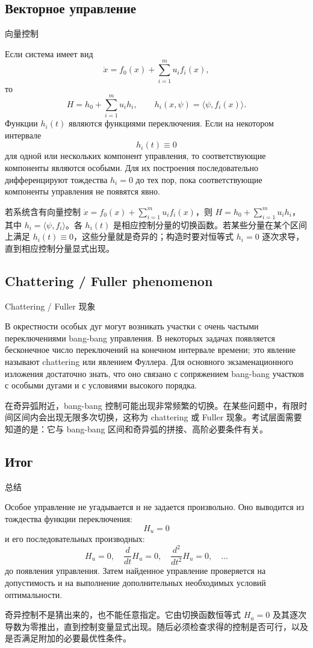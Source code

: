 \documentclass[12pt,a4paper]{article}
\newcommand{\zh}[1]{\par\noindent #1\par}
\begin{document}
\subsection*{Векторное управление}
\zh{向量控制}
Если система имеет вид
\[
\dot x=f_0(x)+\sum_{i=1}^m u_i f_i(x),
\]
то
\[
H=h_0+\sum_{i=1}^m u_i h_i,
\qquad
h_i(x,\psi)=\langle \psi,f_i(x)\rangle.
\]
Функции $h_i(t)$ являются функциями переключения. Если на некотором интервале
\[
h_i(t)\equiv0
\]
для одной или нескольких компонент управления, то соответствующие компоненты являются особыми. Для их построения последовательно дифференцируют тождества $h_i=0$ до тех пор, пока соответствующие компоненты управления не появятся явно.
\zh{若系统含有向量控制 \(\dot x=f_0(x)+\sum_{i=1}^m u_i f_i(x)\)，则 \(H=h_0+\sum_{i=1}^m u_i h_i\)，其中 \(h_i=\langle\psi,f_i\rangle\)。各 \(h_i(t)\) 是相应控制分量的切换函数。若某些分量在某个区间上满足 \(h_i(t)\equiv0\)，这些分量就是奇异的；构造时要对恒等式 \(h_i=0\) 逐次求导，直到相应控制分量显式出现。}

\subsection*{Chattering / Fuller phenomenon}
\zh{Chattering / Fuller 现象}
В окрестности особых дуг могут возникать участки с очень частыми переключениями bang-bang управления. В некоторых задачах появляется бесконечное число переключений на конечном интервале времени; это явление называют chattering или явлением Фуллера. Для основного экзаменационного изложения достаточно знать, что оно связано с сопряжением bang-bang участков с особыми дугами и с условиями высокого порядка.
\zh{在奇异弧附近，bang-bang 控制可能出现非常频繁的切换。在某些问题中，有限时间区间内会出现无限多次切换，这称为 chattering 或 Fuller 现象。考试层面需要知道的是：它与 bang-bang 区间和奇异弧的拼接、高阶必要条件有关。}

\subsection*{Итог}
\zh{总结}
Особое управление не угадывается и не задается произвольно. Оно выводится из тождества функции переключения:
\[
H_u=0
\]
и его последовательных производных:
\[
H_u=0,
\quad \frac{d}{dt}H_u=0,
\quad
\frac{d^2}{dt^2}H_u=0,
\quad \ldots
\]
до появления управления. Затем найденное управление проверяется на допустимость и на выполнение дополнительных необходимых условий оптимальности.
\zh{奇异控制不是猜出来的，也不能任意指定。它由切换函数恒等式 \(H_u=0\) 及其逐次导数为零推出，直到控制变量显式出现。随后必须检查求得的控制是否可行，以及是否满足附加的必要最优性条件。}
\end{document}

